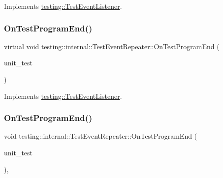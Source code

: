 Implements \mbox{\hyperlink{classtesting_1_1_test_event_listener_a054f8705c883fa120b91473aff38f2ee}{testing\+::\+Test\+Event\+Listener}}.

\mbox{\label{classtesting_1_1internal_1_1_test_event_repeater_a4622616259747dbcc23f5ee39ef99ec0}} 
\subsubsection{\texorpdfstring{OnTestProgramEnd()}{OnTestProgramEnd()}\hspace{0.1cm}{\footnotesize\ttfamily [1/3]}}
{\footnotesize\ttfamily virtual void testing\+::internal\+::\+Test\+Event\+Repeater\+::\+On\+Test\+Program\+End (\begin{DoxyParamCaption}\item[{const \mbox{\hyperlink{classtesting_1_1_unit_test}{Unit\+Test}} \&}]{unit\+\_\+test }\end{DoxyParamCaption})\hspace{0.3cm}{\ttfamily [virtual]}}



Implements \mbox{\hyperlink{classtesting_1_1_test_event_listener_ad15b6246d94c268e233487a86463ef3d}{testing\+::\+Test\+Event\+Listener}}.

\mbox{\label{classtesting_1_1internal_1_1_test_event_repeater_a255378258ea0d14688303d4a6421746f}} 
\subsubsection{\texorpdfstring{OnTestProgramEnd()}{OnTestProgramEnd()}\hspace{0.1cm}{\footnotesize\ttfamily [2/3]}}
{\footnotesize\ttfamily void testing\+::internal\+::\+Test\+Event\+Repeater\+::\+On\+Test\+Program\+End (\begin{DoxyParamCaption}\item[{const \mbox{\hyperlink{classtesting_1_1_unit_test}{Unit\+Test}} \&}]{unit\+\_\+test }\end{DoxyParamCaption})\hspace{0.3cm}{\ttfamily [override]}, {\ttfamily [virtual]}}



